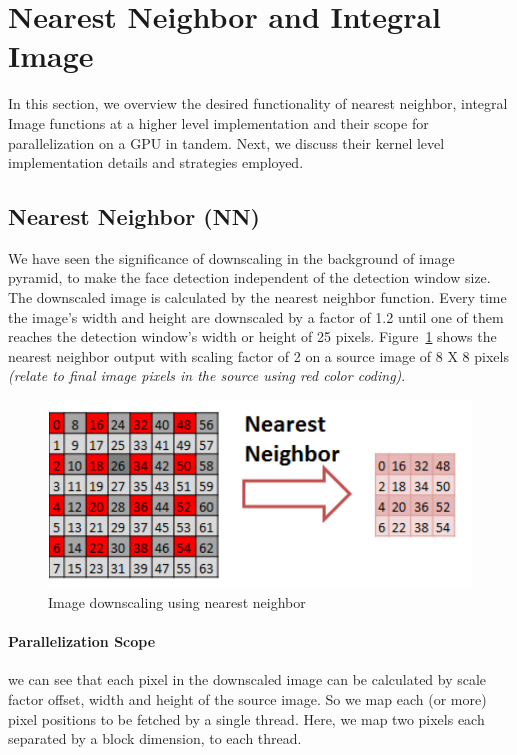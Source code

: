 \section{Nearest Neighbor and Integral Image}\label{sec:nnii}


In this section, we overview the desired functionality of nearest neighbor, 
integral Image functions at a higher level implementation and their scope 
for parallelization on a GPU in tandem. Next, we discuss their kernel 
level implementation details and strategies employed.

\subsection{Nearest Neighbor (NN)}\label{sec:nn}

We have seen the significance of downscaling in the background of image 
pyramid, to make the face detection independent of the detection window size.  
The downscaled image is calculated by the nearest neighbor function. 
Every time the image’s width and height are downscaled by a factor 
of 1.2 until one of them reaches the detection window’s width or height of 25 pixels. 
Figure~\ref{fig:NN} shows the nearest neighbor output  with 
scaling factor of 2 on a source image of 8 X 8 pixels
\textit{(relate to final image pixels in the source using red color coding)}.

\begin{figure}[h]
  \centering
  \includegraphics[width=0.9\linewidth]{figs/nn_img_crop.pdf}
  \caption{Image downscaling using nearest neighbor}
  \label{fig:NN}
\end{figure}

\paragraph{Parallelization Scope}
we can see that each pixel in the downscaled image can be calculated 
by scale factor offset,  width and  height of the source image. 
So we map each (or more) pixel positions to be fetched 
by a single thread. Here, we map two pixels each separated 
by a block dimension, to each thread.


